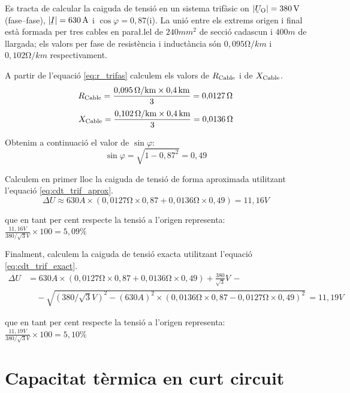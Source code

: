 \vspace{2mm}
\begin{exemple}
   Es tracta de calcular la caiguda de tensi\'{o} en un sistema trif\`{a}sic on $|\cmplx{U}\ped{O}| = 380\unit{V}$ (fase--fase), $|\cmplx{I}|=630\unit{A}$ i $\cos \varphi = 0{,}87$(i). La uni\'{o} entre els extrems origen  i final est\`{a} formada per tres cables en para{\l.l}el de $240\unit{mm^2}$ de secci\'{o} cadascun i $400\unit{m}$ de llargada; els valors per fase de resist\`{e}ncia i induct\`{a}ncia s\'{o}n $0{,}095\unit{\ohm/km}$ i $0{,}102\unit{\ohm/km}$ respectivament.

A partir de l'equaci\'{o} \eqref{eq:r_trifas} calculem els valors de $R_\mathrm{Cable}$ i de $X_\mathrm{Cable}$.
\[
   R_\mathrm{Cable} = \frac{0{,}095\mathrm{\,\mathrm{\Omega}/km}\times 0{,}4\mathrm{\,km}}{3} = 0{,}0127\mathrm{\,\mathrm{\Omega}}
\]
\[
   X_\mathrm{Cable} = \frac{0{,}102\mathrm{\,\mathrm{\Omega}/km}\times 0{,}4\mathrm{\,km}}{3} = 0{,}0136\mathrm{\,\mathrm{\Omega}}
\]

Obtenim a continuaci\'{o} el valor de $\sin \varphi$:
\[
   \sin \varphi = \sqrt{1-0{,}87^2} = 0,49
\]

Calculem en primer lloc la caiguda de tensi\'{o} de forma aproximada utilitzant l'equaci\'{o} \eqref{eq:cdt_trif_aprox}.
\[
   \Delta U \approx 630\unit{A} \times ( 0{,}0127\unit{\ohm} \times 0{,}87 + 0{,}0136\unit{\ohm} \times 0{,}49 ) = 11{,}16\unit{V}
\]

que en tant per cent respecte la tensi\'{o} a l'origen representa:
$\frac{11{,}16\unit{V}}{380/\sqrt{3}\unit{V}} \times 100 = 5{,}09\unit{\%} $

Finalment, calculem la caiguda de tensi\'{o} exacta utilitzant l'equaci\'{o} \eqref{eq:cdt_trif_exact}.
\[ \begin{split}
   \Delta U &=  630\unit{A} \times ( 0{,}0127\unit{\ohm} \times 0{,}87 + 0{,}0136\unit{\ohm} \times 0{,}49 ) + \frac{380}{\sqrt{3}}\unit{V} \,- \\
    & \quad - \sqrt{(380/\sqrt{3}\unit{V})^2 - (630\unit{A})^2 \times ( 0{,}0136\unit{\ohm} \times 0{,}87 - 0{,}0127\unit{\ohm} \times 0{,}49 )^2 } \,= 11{,}19\unit{V}
\end{split} \]

que en tant per cent respecte la tensi\'{o} a l'origen representa:
$\frac{11{,}19\unit{V}}{380/\sqrt{3}\unit{V}} \times 100 = 5{,}10\unit{\%} $
\end{exemple}

\section{Capacitat t\`{e}rmica en curt circuit}

